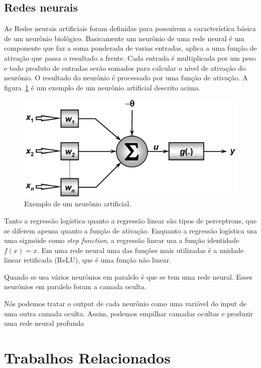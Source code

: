 \documentclass[diss,capa]{texufpel}
\begin{document}
\subsection{Redes neurais}

As Redes neurais artificiais foram definidas para possuírem a característica básica de um neurônio biológico. Basicamente um neurônio de uma rede neural é um componente que faz a soma ponderada de varias entradas, aplica a uma função de ativação que passa o resultado a frente. Cada entrada é multiplicada por um peso e todo produto de entradas serão somados para calcular o nível de ativação do neurônio. O resultado do neurônio é processado por uma função de ativação. A figura~\ref{fig:neuronio-artifical} é um exemplo de um neurônio artificial descrito acima.

\begin{figure}[htbp]
\centering \includegraphics[scale=.2]{imagens/Sadssa.png}
\caption{Exemplo de um neurônio artificial.}
\label{fig:neuronio-artifical}
\end{figure}

Tanto a regressão logística quanto a regressão linear são tipos de perceptrons, que se diferem apensa quanto a função de ativação. Enquanto a regressão logística usa uma sigmóide como \textit{step function}, a regressão linear usa a função identidade \(f(x) = x\). Em uma rede neural uma das funções mais utilizadas é a unidade linear retificada (ReLU), que é uma função não linear.

Quando se usa vários neurônios em paralelo é que se tem uma rede neural. Esses neurônios em paralelo foram a camada oculta. 

Nós podemos tratar o output de cada neurônio como uma variável do input de uma outra camada oculta. Assim, podemos empilhar camadas ocultas e produzir uma rede neural profunda



\section{Trabalhos Relacionados}
\end{document}
